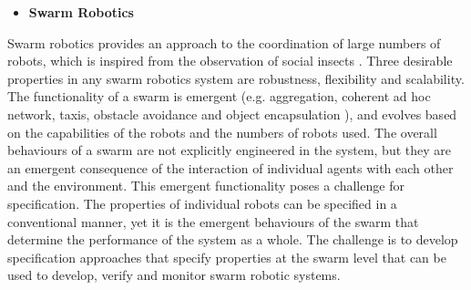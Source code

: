\documentclass[sigconf,nonacm]{acmart}%
\begin{document}
\begin{itemize}[leftmargin=0.5cm]
	\item \textbf{Swarm Robotics}
\end{itemize}
Swarm robotics provides an approach to the coordination of large numbers of robots, which is inspired from the observation of social insects \cite{Sahin2005}. Three desirable properties in any swarm robotics system are robustness, flexibility and scalability. 
The functionality of a swarm is emergent (e.g. aggregation, coherent ad hoc network, taxis, obstacle avoidance and object encapsulation \cite{Winfield2006}), and evolves based on the capabilities of the robots and the numbers of robots used. 
The overall behaviours of a swarm are not explicitly engineered in the system, but they are an emergent consequence of the interaction of individual agents with each other and the environment.
This emergent functionality poses a challenge for specification. The properties of individual robots can be specified in a conventional manner, yet it is the emergent behaviours of the swarm that determine the performance of the system as a whole. The challenge is to develop specification approaches that specify properties at the swarm level that can be used to develop, verify and monitor swarm robotic systems.
\end{document}
